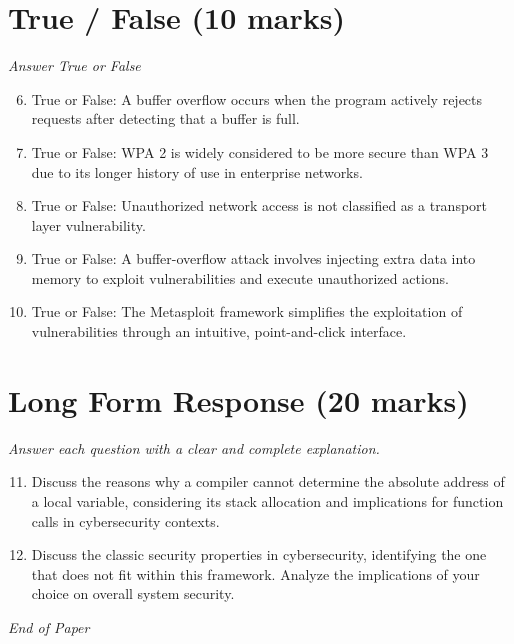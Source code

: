 \documentclass[12pt]{article}
\begin{document}
\section*{True / False (10 marks)}
\textit{Answer True or False}
\begin{enumerate}[label=\arabic*.]
\setcounter{enumi}{5}
\item True or False: A buffer overflow occurs when the program actively rejects requests after detecting that a buffer is full.
\item True or False: WPA 2 is widely considered to be more secure than WPA 3 due to its longer history of use in enterprise networks.
\item True or False: Unauthorized network access is not classified as a transport layer vulnerability.
\item True or False: A buffer-overflow attack involves injecting extra data into memory to exploit vulnerabilities and execute unauthorized actions.
\item True or False: The Metasploit framework simplifies the exploitation of vulnerabilities through an intuitive, point-and-click interface.
\end{enumerate}

\section*{Long Form Response (20 marks)}
\textit{Answer each question with a clear and complete explanation.}
\begin{enumerate}[label=\arabic*.]
\setcounter{enumi}{10}
\item Discuss the reasons why a compiler cannot determine the absolute address of a local variable, considering its stack allocation and implications for function calls in cybersecurity contexts.
\item Discuss the classic security properties in cybersecurity, identifying the one that does not fit within this framework. Analyze the implications of your choice on overall system security.
\end{enumerate}

\vfill
\noindent\textit{End of Paper}
\end{document}
